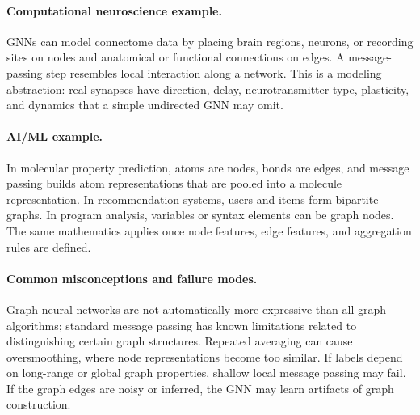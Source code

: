 \paragraph{Computational neuroscience example.}
GNNs can model connectome data by placing brain regions, neurons, or recording sites on nodes and anatomical or functional connections on edges. A message-passing step resembles local interaction along a network. This is a modeling abstraction: real synapses have direction, delay, neurotransmitter type, plasticity, and dynamics that a simple undirected GNN may omit.

\paragraph{AI/ML example.}
In molecular property prediction, atoms are nodes, bonds are edges, and message passing builds atom representations that are pooled into a molecule representation. In recommendation systems, users and items form bipartite graphs. In program analysis, variables or syntax elements can be graph nodes. The same mathematics applies once node features, edge features, and aggregation rules are defined.

\paragraph{Common misconceptions and failure modes.}
Graph neural networks are not automatically more expressive than all graph algorithms; standard message passing has known limitations related to distinguishing certain graph structures. Repeated averaging can cause oversmoothing, where node representations become too similar. If labels depend on long-range or global graph properties, shallow local message passing may fail. If the graph edges are noisy or inferred, the GNN may learn artifacts of graph construction.

